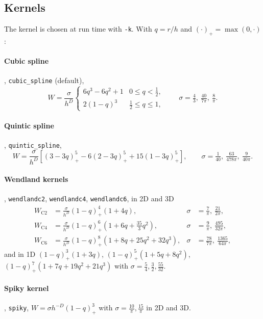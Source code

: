 \documentclass[10pt,fleqn,twoside]{article}
\newcommand{\code}[1]{\texttt{#1}}
\begin{document}
\subsection{Kernels}
The kernel is chosen at run time with \code{-k}. With $q = r/h$ and $(\cdot)_+ = \max(0,\cdot)$:

\paragraph{Cubic spline} \citep{1985A&A...149..135M}, \code{cubic\_spline} (default),
\begin{equation}
 W = \frac{\sigma}{h^D}\begin{cases} 6q^3 - 6q^2 + 1 & 0 \leq q < \frac{1}{2},\\
 2(1-q)^3 & \frac{1}{2} \leq q \leq 1, \end{cases}
 \qquad \sigma = \tfrac{4}{3},\ \tfrac{40}{7\pi},\ \tfrac{8}{\pi}.
\end{equation}

\paragraph{Quintic spline}, \code{quintic\_spline},
\begin{equation}
 W = \frac{\sigma}{h^D}\left[(3-3q)_+^5 - 6(2-3q)_+^5 + 15(1-3q)_+^5\right],
 \qquad \sigma = \tfrac{1}{40},\ \tfrac{63}{478\pi},\ \tfrac{9}{40\pi}.
\end{equation}

\paragraph{Wendland kernels} \citep{2012MNRAS.425.1068D}, \code{wendlandc2}, \code{wendlandc4}, \code{wendlandc6}, in
2D and 3D
\begin{align}
 W_\mathrm{C2} &= \frac{\sigma}{h^D}(1-q)_+^4(1+4q), & \sigma &= \tfrac{7}{\pi},\ \tfrac{21}{2\pi},\\
 W_\mathrm{C4} &= \frac{\sigma}{h^D}(1-q)_+^6\left(1+6q+\tfrac{35}{3}q^2\right), & \sigma &= \tfrac{9}{\pi},\ \tfrac{495}{32\pi},\\
 W_\mathrm{C6} &= \frac{\sigma}{h^D}(1-q)_+^8(1+8q+25q^2+32q^3), & \sigma &= \tfrac{78}{7\pi},\ \tfrac{1365}{64\pi},
\end{align}
and in 1D $(1-q)_+^3(1+3q)$, $(1-q)_+^5(1+5q+8q^2)$, $(1-q)_+^7(1+7q+19q^2+21q^3)$ with $\sigma = \frac{5}{4},
\frac{3}{2}, \frac{55}{32}$.

\paragraph{Spiky kernel} \citep{desbrun1996}, \code{spiky}, $W = \sigma h^{-D}(1-q)_+^3$ with
$\sigma = \frac{10}{\pi}, \frac{15}{\pi}$ in 2D and 3D.
\end{document}
